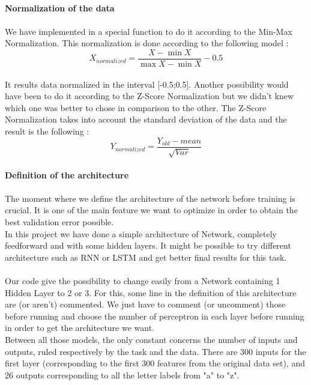 \documentclass[a4paper]{report}
\begin{document}
\paragraph{Normalization of the data}
\paragraph{} We have implemented in a special function to do it according to the Min-Max Normalization. This normalization is done according to the following model :
\begin{equation}
X_{normalized} =\frac{X-\min X}{\max X-\min X} - 0.5
\end{equation}
\paragraph{} It results data normalized in the interval [-0.5;0.5]. Another possibility would have been to do it according to the Z-Score Normalization but we didn't knew which one was better to chose in comparison to the other. The Z-Score Normalization takes into account the standard deviation of the data and the result is the following :
\begin{equation}
Y_{normalized} =\frac{Y_{old}- mean}{\sqrt{Var}}
\end{equation}
\paragraph{Definition of the architecture} 
\paragraph{}The moment where we define the architecture of the network before training is crucial. It is one of the main feature we want to optimize in order to obtain the best validation error possible.
\\ In this project we have done a simple architecture of Network, completely feedforward and with some hidden layers.
It might be possible to try different architecture such as RNN or LSTM and get better final results for this task.
\paragraph{} Our code give the possibility to change easily from a Network containing 1 Hidden Layer to 2 or 3. For this, some line in the definition of this architecture are (or aren't) commented. We just have to comment (or uncomment) those before running and choose the number of perceptron in each layer before running in order to get the architecture we want.
\\Between all those models, the only constant concerns the number of inputs and outputs, ruled respectively by the task and the data. There are 300 inputs for the first layer (corresponding to the first 300 features from the original data set), and 26 outputs corresponding to all the letter labels from "a" to "z".
\end{document}
